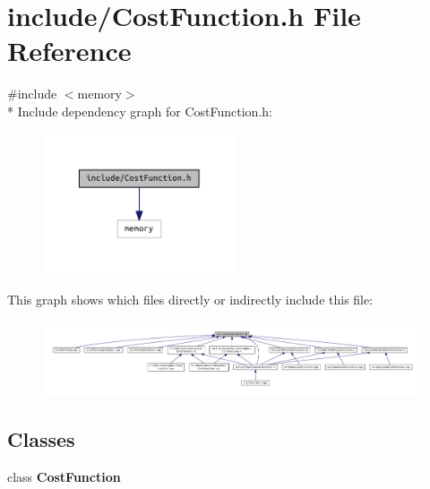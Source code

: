 \section{include/\+Cost\+Function.h File Reference}
\label{_cost_function_8h}
{\ttfamily \#include $<$memory$>$}\\*
Include dependency graph for Cost\+Function.\+h\+:\nopagebreak
\begin{figure}[H]
\begin{center}
\leavevmode
\includegraphics[width=161pt]{_cost_function_8h__incl}
\end{center}
\end{figure}
This graph shows which files directly or indirectly include this file\+:\nopagebreak
\begin{figure}[H]
\begin{center}
\leavevmode
\includegraphics[width=350pt]{_cost_function_8h__dep__incl}
\end{center}
\end{figure}
\subsection*{Classes}
\begin{DoxyCompactItemize}
\item 
class {\bf Cost\+Function}
\end{DoxyCompactItemize}
